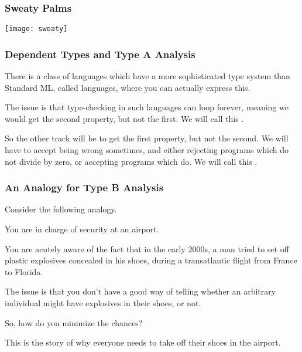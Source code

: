 \documentclass[aspectratio=169, handout]{beamer}
\begin{document}
\begin{frame}[fragile]
  \frametitle{Sweaty Palms}

  \begin{center}
    \texttt{[image: sweaty]}
  \end{center}
\end{frame}

\begin{frame}[fragile]
  \frametitle{Dependent Types and Type A Analysis}

  There is a class of languages which have a more sophisticated type
  system than Standard ML, called  languages,
  where you can actually express this.

  \pause
  \vspace{\fill}

  The issue is that type-checking in such languages can loop forever,
  meaning we would get the second property, but not the first. We will
  call this .

  \pause
  \vspace{\fill}

  So the other track will be to get the first property, but not the second.
  We will have to accept being wrong sometimes, and either rejecting
  programs which do not divide by zero, or accepting programs which do.
  We will call this .
\end{frame}

\begin{frame}[fragile]
  \frametitle{An Analogy for Type B Analysis}

  Consider the following analogy.

  \pause
  \vspace{\fill}

  You are in charge of security at an airport.

  \pause
  \vspace{\fill}

  You are acutely aware of the fact that in the early 2000s, a man tried to set off
  plastic explosives concealed in his shoes, during a transatlantic flight
  from France to Florida.

  \pause
  \vspace{\fill}

  The issue is that you don't have a good way of telling whether an arbitrary
  individual might have explosives in their shoes, or not.

  \pause
  \vspace{\fill}

  So, how do you minimize the chances?

  \pause
  \vspace{\fill}

  This is the story of why everyone needs to take off their shoes in the airport.
\end{frame}
\end{document}
